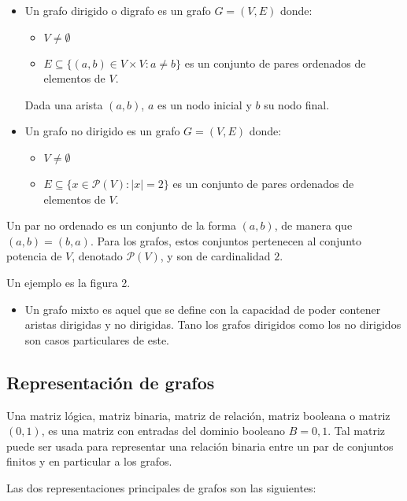 \documentclass[10pt]{article}
\begin{document}
\begin{itemize}
\item Un grafo dirigido o digrafo es un grafo $G = (V,E)$ donde:
\begin{itemize}
\item $V\not= \emptyset$
\item $E \subseteq \{(a,b) \in V\times V \colon a \not= b\}$ es un conjunto de pares ordenados de elementos de $V$.
\end{itemize}
Dada una arista $(a,b)$, $a$ es un nodo inicial y $b$ su nodo final.








\item Un grafo no dirigido es un grafo $G = (V,E)$ donde:
\begin{itemize}
\item $V\not= \emptyset$
\item $E \subseteq \{x \in \mathcal{P}(V) \colon |x|=2\}$ es un conjunto de pares ordenados de elementos de $V$.
\end{itemize}
\end{itemize}
Un par no ordenado es un conjunto de la forma $(a,b)$, de manera que $(a,b)=(b,a)$. Para los grafos, estos conjuntos pertenecen al conjunto potencia de $V$, denotado $\mathcal{P}(V)$, y son de cardinalidad $2$.

Un ejemplo es la figura 2. \\


\begin{itemize}
\item Un grafo mixto es aquel que se define con la capacidad de poder contener aristas dirigidas y no dirigidas. Tano los grafos dirigidos como los no dirigidos son casos particulares de este.
\end{itemize}


\subsection{Representación de grafos}

Una matriz lógica, matriz binaria, matriz de relación, matriz booleana o matriz $(0,1)$, es una matriz con entradas del dominio booleano $B = 0, 1$. Tal matriz puede ser usada para representar una relación binaria entre un par de conjuntos finitos y en particular a los grafos.

Las dos representaciones principales de grafos son las siguientes: \\
\end{document}
